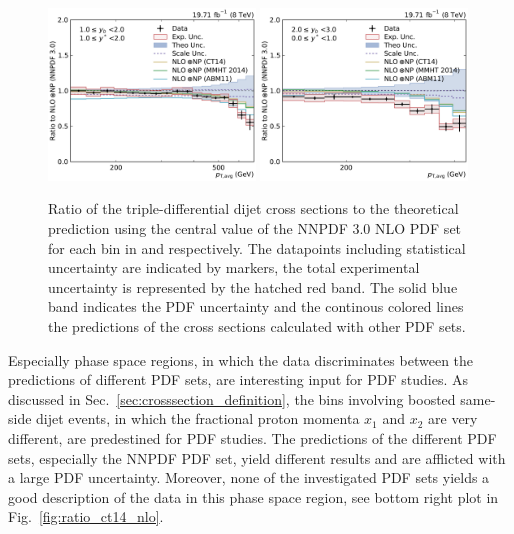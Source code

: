 \begin{figure}[htbp]
    \includegraphics[width=0.49\textwidth]{figures/measurement/ratio_to_NNPDF30+np_totcomp_yb1ys1.pdf}\hfill
    \includegraphics[width=0.49\textwidth]{figures/measurement/ratio_to_NNPDF30+np_totcomp_yb2ys0.pdf}
    \caption[Ratio of the cross section to NNPDF 3.0 NLO]{
    Ratio of the triple-differential dijet cross sections to the theoretical
    prediction using the central value of the NNPDF 3.0 NLO PDF set for each bin in \ystar
    and \yboost respectively. The datapoints including statistical uncertainty are
    indicated by markers, the total experimental uncertainty is represented by the
    hatched red band. The solid blue band indicates the PDF uncertainty and the
    continous colored lines the predictions of the cross sections calculated with
    other PDF sets. }

    \label{fig:ratio_nnpdf30_nlo}
\end{figure}

Especially phase space regions, in which the data discriminates between the
predictions of different PDF sets, are interesting input for PDF studies. As
discussed in Sec.~\ref{sec:crosssection_definition}, the bins involving boosted
same-side dijet events, in which the fractional proton momenta $x_1$ and $x_2$
are very different, are predestined for PDF studies. The predictions of the
different PDF sets, especially the NNPDF PDF set, yield different results and
are afflicted with a large PDF uncertainty. Moreover, none of the investigated
PDF sets yields a good description of the data in this phase space region, see
bottom right plot in Fig.~\ref{fig:ratio_ct14_nlo}.



